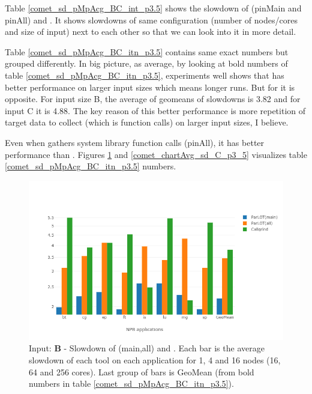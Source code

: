 







Table \ref{comet_sd_pMpAcg_BC_int_p3.5} shows the slowdown of \parlot (pinMain and pinAll) and \callgrind. It shows slowdowns of same configuration (number of nodes/cores and size of input) next to each other so that we can look into it in more detail.


Table \ref{comet_sd_pMpAcg_BC_itn_p3.5} contains same exact numbers but grouped differently. In big picture, as average, by looking at bold numbers of table \ref{comet_sd_pMpAcg_BC_itn_p3.5}, experiments well shows that \parlot has better performance on larger input sizes which means longer runs. But for \callgrind it is opposite. For input size B, the average of geomeans of slowdowns is 3.82 and for input C it is 4.88. The key reason of this better performance is more repetition of target data to collect (which is function calls) on larger input sizes, I believe. 

Even when \parlot gathers system library function calls (pinAll), it has better performance than \callgrind. Figures \ref{comet_chartAvg_sd_B_p3_5} and \ref{comet_chartAvg_sd_C_p3_5} visualizes table \ref{comet_sd_pMpAcg_BC_itn_p3.5} numbers.


\begin{figure}[!t]
\centering
\includegraphics[width=6in]{figs.comet/comet_chartAvg_sd_B_p3_5.png}
\caption{ Input: \textbf{B} - Slowdown of \parlot(main,all) and \callgrind. Each bar is the average slowdown of each tool on each application for 1, 4 and 16 nodes (16, 64 and 256 cores). Last group of bars is GeoMean (from bold numbers in table \ref{comet_sd_pMpAcg_BC_itn_p3.5}). 
}
\label{comet_chartAvg_sd_B_p3_5}
\end{figure}


